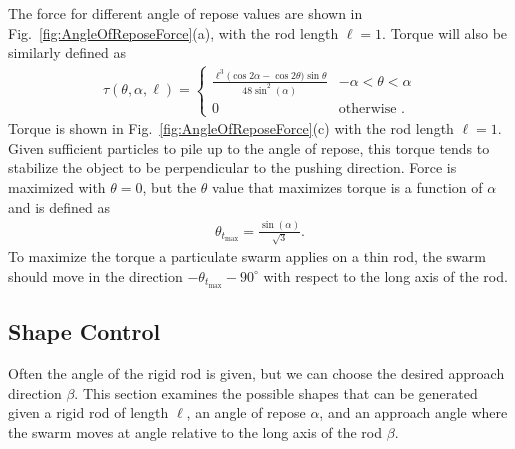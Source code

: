 
The force for different angle of repose values are shown in Fig.~\ref{fig:AngleOfReposeForce}(a), with the rod length $\ell=1$. 
Torque will also be similarly defined as
\begin{align}
\tau(\theta, \alpha, \ell) =\left\{
\begin{array}{ll}
\frac{\ell^3\Big(\cos{2\alpha}-\cos{2\theta}\Big)\sin{\theta} }{48\sin^2(\alpha)}&   -\alpha<\theta<\alpha\\
0 &    \textrm{otherwise .} 
\end{array} 
\right.  \label{eq:TorqueAOR}
\end{align}
Torque is shown in Fig.~\ref{fig:AngleOfReposeForce}(c) with the rod length $\ell=1$. 
 Given sufficient particles to pile up to the angle of repose, this torque tends to stabilize the object to be perpendicular to the pushing direction.
Force is maximized with $\theta=0$, but the $\theta$ value that maximizes torque is a function of $\alpha$ and is defined as
\begin{align}\label{eq:maxTorqueAngleGivenAOR}
\theta_{t_{\max}} = \frac{\sin(\alpha)}{\sqrt{3}}.
\end{align}
To maximize the torque a particulate swarm applies on a thin rod, the swarm should move in the direction $-\theta_{t_{\max}} - 90^\circ$ with respect to the long axis of the rod.

\subsection{Shape Control}

Often the angle of the rigid rod is given, but we can choose the desired approach direction $\beta$. 
 This section examines the possible shapes that can be generated given a rigid rod of length $\ell$, an angle of repose $\alpha$, and an approach angle where the swarm moves at angle relative to the long axis of the rod $\beta$.

